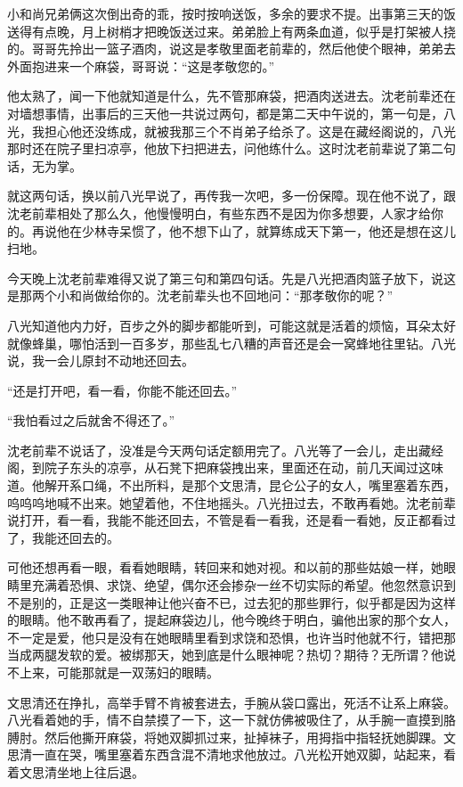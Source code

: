 小和尚兄弟俩这次倒出奇的乖，按时按响送饭，多余的要求不提。出事第三天的饭送得有点晚，月上树梢才把晚饭送过来。弟弟脸上有两条血道，似乎是打架被人挠的。哥哥先拎出一篮子酒肉，说这是孝敬里面老前辈的，然后他使个眼神，弟弟去外面抱进来一个麻袋，哥哥说：“这是孝敬您的。”

他太熟了，闻一下他就知道是什么，先不管那麻袋，把酒肉送进去。沈老前辈还在对墙想事情，出事后的三天他一共说过两句，都是第二天中午说的，第一句是，八光，我担心他还没练成，就被我那三个不肖弟子给杀了。这是在藏经阁说的，八光那时还在院子里扫凉亭，他放下扫把进去，问他练什么。这时沈老前辈说了第二句话，无为掌。

就这两句话，换以前八光早说了，再传我一次吧，多一份保障。现在他不说了，跟沈老前辈相处了那么久，他慢慢明白，有些东西不是因为你多想要，人家才给你的。再说他在少林寺呆惯了，他不想下山了，就算练成天下第一，他还是想在这儿扫地。

今天晚上沈老前辈难得又说了第三句和第四句话。先是八光把酒肉篮子放下，说这是那两个小和尚做给你的。沈老前辈头也不回地问：“那孝敬你的呢？”

八光知道他内力好，百步之外的脚步都能听到，可能这就是活着的烦恼，耳朵太好就像蜂巢，哪怕活到一百多岁，那些乱七八糟的声音还是会一窝蜂地往里钻。八光说，我一会儿原封不动地还回去。

“还是打开吧，看一看，你能不能还回去。”

“我怕看过之后就舍不得还了。”

沈老前辈不说话了，没准是今天两句话定额用完了。八光等了一会儿，走出藏经阁，到院子东头的凉亭，从石凳下把麻袋拽出来，里面还在动，前几天闻过这味道。他解开系口绳，不出所料，是那个文思清，昆仑公子的女人，嘴里塞着东西，呜呜呜地喊不出来。她望着他，不住地摇头。八光扭过去，不敢再看她。沈老前辈说打开，看一看，我能不能还回去，不管是看一看我，还是看一看她，反正都看过了，我能还回去的。

可他还想再看一眼，看看她眼睛，转回来和她对视。和以前的那些姑娘一样，她眼睛里充满着恐惧、求饶、绝望，偶尔还会掺杂一丝不切实际的希望。他忽然意识到不是别的，正是这一类眼神让他兴奋不已，过去犯的那些罪行，似乎都是因为这样的眼睛。他不敢再看了，提起麻袋边儿，他今晚终于明白，骗他出家的那个女人，不一定是爱，他只是没有在她眼睛里看到求饶和恐惧，也许当时他就不行，错把那当成两腿发软的爱。被绑那天，她到底是什么眼神呢？热切？期待？无所谓？他说不上来，可能那就是一双荡妇的眼睛。

文思清还在挣扎，高举手臂不肯被套进去，手腕从袋口露出，死活不让系上麻袋。八光看着她的手，情不自禁摸了一下，这一下就仿佛被吸住了，从手腕一直摸到胳膊肘。然后他撕开麻袋，将她双脚抓过来，扯掉袜子，用拇指中指轻抚她脚踝。文思清一直在哭，嘴里塞着东西含混不清地求他放过。八光松开她双脚，站起来，看着文思清坐地上往后退。

